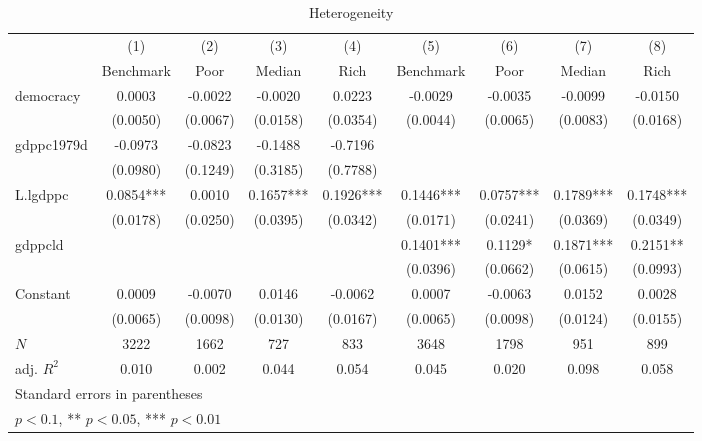 \begin{table}[htbp]\centering
\def\sym#1{\ifmmode^{#1}\else\(^{#1}\)\fi}
\caption{Heterogeneity \label{tab:regression2}}
\begin{tabular}{l*{8}{c}}
\hline\hline
            &\multicolumn{1}{c}{(1)}&\multicolumn{1}{c}{(2)}&\multicolumn{1}{c}{(3)}&\multicolumn{1}{c}{(4)}&\multicolumn{1}{c}{(5)}&\multicolumn{1}{c}{(6)}&\multicolumn{1}{c}{(7)}&\multicolumn{1}{c}{(8)}\\
            &\multicolumn{1}{c}{Benchmark}&\multicolumn{1}{c}{Poor}&\multicolumn{1}{c}{Median}&\multicolumn{1}{c}{Rich}&\multicolumn{1}{c}{Benchmark}&\multicolumn{1}{c}{Poor}&\multicolumn{1}{c}{Median}&\multicolumn{1}{c}{Rich}\\
\hline
democracy   &      0.0003   &     -0.0022   &     -0.0020   &      0.0223   &     -0.0029   &     -0.0035   &     -0.0099   &     -0.0150   \\
            &    (0.0050)   &    (0.0067)   &    (0.0158)   &    (0.0354)   &    (0.0044)   &    (0.0065)   &    (0.0083)   &    (0.0168)   \\
[1em]
gdppc1979d  &     -0.0973   &     -0.0823   &     -0.1488   &     -0.7196   &               &               &               &               \\
            &    (0.0980)   &    (0.1249)   &    (0.3185)   &    (0.7788)   &               &               &               &               \\
[1em]
L.lgdppc    &      0.0854***&      0.0010   &      0.1657***&      0.1926***&      0.1446***&      0.0757***&      0.1789***&      0.1748***\\
            &    (0.0178)   &    (0.0250)   &    (0.0395)   &    (0.0342)   &    (0.0171)   &    (0.0241)   &    (0.0369)   &    (0.0349)   \\
[1em]
gdppcld     &               &               &               &               &      0.1401***&      0.1129*  &      0.1871***&      0.2151** \\
            &               &               &               &               &    (0.0396)   &    (0.0662)   &    (0.0615)   &    (0.0993)   \\
[1em]
Constant    &      0.0009   &     -0.0070   &      0.0146   &     -0.0062   &      0.0007   &     -0.0063   &      0.0152   &      0.0028   \\
            &    (0.0065)   &    (0.0098)   &    (0.0130)   &    (0.0167)   &    (0.0065)   &    (0.0098)   &    (0.0124)   &    (0.0155)   \\
\hline
\(N\)       &        3222   &        1662   &         727   &         833   &        3648   &        1798   &         951   &         899   \\
adj. \(R^{2}\)&       0.010   &       0.002   &       0.044   &       0.054   &       0.045   &       0.020   &       0.098   &       0.058   \\
\hline\hline
\multicolumn{9}{l}{\footnotesize Standard errors in parentheses}\\
\multicolumn{9}{l}{\footnotesize * \(p<0.1\), ** \(p<0.05\), *** \(p<0.01\)}\\
\end{tabular}
\end{table}
